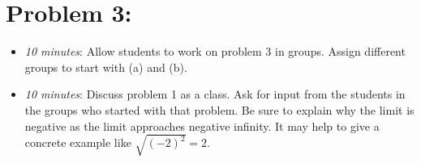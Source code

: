 \documentclass[handout,nooutcomes]{ximera}
\begin{document}
	
	
\section*{Problem 3:}

	\begin{itemize}
	
	\item  \emph{10 minutes}:  Allow students to work on problem 3 in groups.  Assign different groups to start with (a) and (b).
	
	\item  \emph{10 minutes}:  Discuss problem 1 as a class.  Ask for input from the students in the groups who started with that problem.  Be sure to explain why the limit is negative as the limit approaches negative infinity.  It may help to give a concrete example like $\sqrt{(-2)^2} = 2$.  
		
	\end{itemize}
	
	
	

	
	
	
\end{document}
